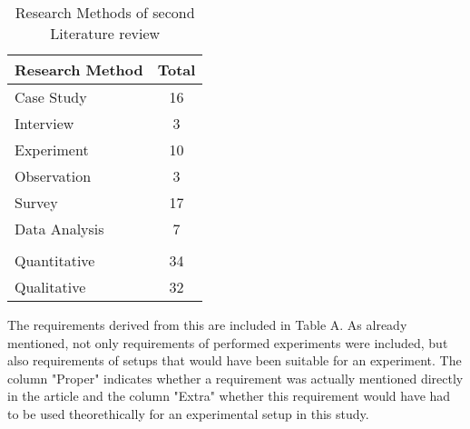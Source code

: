 \begin{table}[htbp]
    \centering
    \begin{tabular}{ll}
    \hline
    \multicolumn{1}{l}{Research Method} & \multicolumn{1}{l}{Total} \\ \hline
    \multicolumn{1}{l}{Case  Study}     & \multicolumn{1}{c}{16}    \\ 
    \multicolumn{1}{l}{Interview}       & \multicolumn{1}{c}{3}     \\ 
    \multicolumn{1}{l}{Experiment}      & \multicolumn{1}{c}{10}    \\ 
    \multicolumn{1}{l}{Observation}     & \multicolumn{1}{c}{3}     \\ 
    \multicolumn{1}{l}{Survey}          & \multicolumn{1}{c}{17}    \\ 
    \multicolumn{1}{l}{Data Analysis}   & \multicolumn{1}{c}{7}     \\ 
                                            &                            \\ \hline
    \multicolumn{1}{l}{Quantitative}    & \multicolumn{1}{c}{34}    \\ 
    \multicolumn{1}{l}{Qualitative}     & \multicolumn{1}{c}{32}    \\ \hline
    \end{tabular}
    \caption[Research Methods of second Literature review]{Research Methods of second Literature review}\label{tab:secondLiteratureSearch}
    \end{table}

The requirements derived from this are included in Table A. As already mentioned, not only requirements of performed experiments were included, but also requirements of setups that would have been suitable for an experiment. The column "Proper" indicates whether a requirement was actually mentioned directly in the article and the column "Extra" whether this requirement would have had to be used theorethically for an experimental setup in this study.

